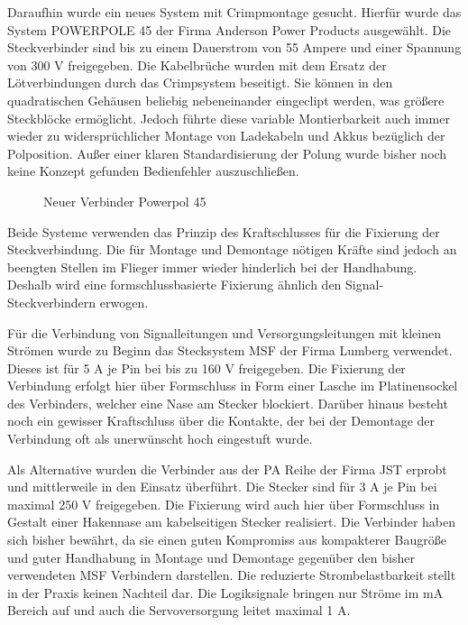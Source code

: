 Daraufhin wurde ein neues System mit Crimpmontage gesucht.
Hierfür wurde das System POWERPOLE 45 der Firma Anderson Power Products ausgewählt. Die Steckverbinder sind bis zu einem Dauerstrom von 55 Ampere und einer Spannung von 300 V freigegeben.
Die Kabelbrüche wurden mit dem Ersatz der Lötverbindungen durch das Crimpsystem beseitigt. Sie können in den quadratischen Gehäusen beliebig nebeneinander eingeclipt werden, was größere Steckblöcke ermöglicht. Jedoch führte diese variable Montierbarkeit auch immer wieder zu widersprüchlicher Montage von Ladekabeln und Akkus bezüglich der Polposition.
Außer einer klaren Standardisierung der Polung wurde bisher noch keine Konzept gefunden Bedienfehler auszuschließen. 

\begin{figure}[H]
\centering
{}
\caption{Neuer Verbinder  Powerpol 45} 
\label{fig:Neuer Verbinder  Powerpol 45}
\end{figure}

Beide Systeme verwenden das Prinzip des Kraftschlusses für die Fixierung der Steckverbindung. Die für Montage und Demontage nötigen Kräfte sind jedoch an beengten Stellen im Flieger immer wieder hinderlich bei der Handhabung. Deshalb wird eine formschlussbasierte Fixierung ähnlich den Signal-Steckverbindern erwogen.

Für die Verbindung von Signalleitungen  und Versorgungsleitungen mit kleinen Strömen wurde zu Beginn das Stecksystem MSF der Firma Lumberg verwendet.
Dieses ist für 5 A je Pin bei bis zu 160 V freigegeben. Die Fixierung der Verbindung erfolgt hier über Formschluss in Form einer Lasche im Platinensockel des Verbinders, welcher eine Nase am Stecker blockiert. Darüber hinaus besteht noch ein gewisser Kraftschluss über die Kontakte, der bei der Demontage der Verbindung oft als unerwünscht hoch eingestuft wurde.

Als Alternative wurden die Verbinder aus der PA Reihe der Firma JST erprobt und mittlerweile in den Einsatz überführt.
Die Stecker sind für 3 A je Pin bei maximal 250 V freigegeben.
Die Fixierung wird auch hier über Formschluss in Gestalt einer Hakennase am kabelseitigen Stecker realisiert.
Die Verbinder haben sich bisher bewährt, da sie einen guten Kompromiss aus kompakterer Baugröße und guter Handhabung in Montage und Demontage gegenüber den bisher verwendeten MSF Verbindern darstellen.
Die reduzierte Strombelastbarkeit stellt in der Praxis keinen Nachteil dar. Die Logiksignale bringen nur Ströme im mA Bereich auf und auch die Servoversorgung leitet maximal 1 A.

